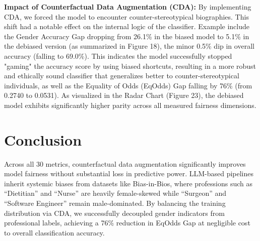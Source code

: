 \documentclass[11pt,letterpaper,twocolumn]{article}
\begin{document}
\textbf{Impact of Counterfactual Data Augmentation (CDA):}
By implementing CDA, we forced the model to encounter counter-stereotypical biographies. This shift had a notable effect on the internal logic of the classifier. Example include the Gender Accuracy Gap dropping from 26.1\% in the biased model to 5.1\% in the debiased version (as summarized in Figure 18), the minor 0.5\% dip in overall accuracy (falling to 69.0\%). This indicates the model successfully stopped "gaming" the accuracy score by using biased shortcuts, resulting in a more robust and ethically sound classifier that generalizes better to counter-stereotypical individuals, as well as the Equality of Odds (EqOdds) Gap falling by 76\% (from 0.2740 to 0.0531). As visualized in the Radar Chart (Figure 23), the debiased model exhibits significantly higher parity across all measured fairness dimensions.
    
	\section{Conclusion}
	Across all 30 metrics, counterfactual data augmentation significantly improves model
	fairness without substantial loss in predictive power. LLM-based pipelines inherit
	systemic biases from datasets like Bias-in-Bios, where professions such as ``Dietitian''
	and ``Nurse'' are heavily female-skewed while ``Surgeon'' and ``Software Engineer''
	remain male-dominated. By balancing the training distribution via CDA, we successfully
	decoupled gender indicators from professional labels, achieving a 76\% reduction in
	EqOdds Gap at negligible cost to overall classification accuracy.
	
\end{document}
